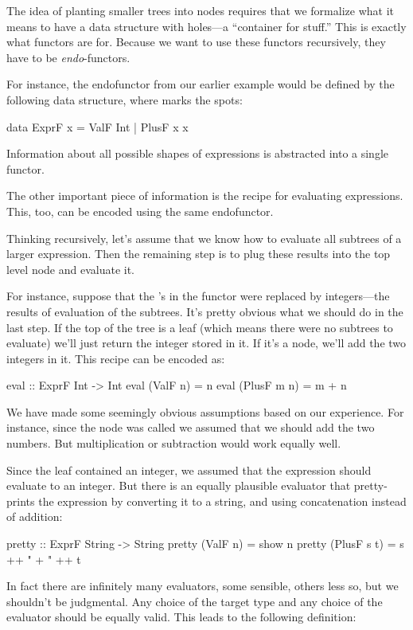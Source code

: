 \documentclass[DaoFP]{subfiles}
\begin{document}
The idea of planting smaller trees into nodes requires that we formalize what it means to have a data structure with holes---a ``container for stuff.'' This is exactly what functors are for. Because we want to use these functors recursively, they have to be \emph{endo}-functors.

For instance, the endofunctor from our earlier example would be defined by the following data structure, where  marks the spots:
\begin{haskell}
data ExprF x = ValF Int | PlusF x x
\end{haskell}
Information about all possible shapes of expressions is abstracted into a single functor. 

The other important piece of information is the recipe for evaluating expressions. This, too, can be encoded using the same endofunctor. 

Thinking recursively, let's assume that we know how to evaluate all subtrees of a larger expression. Then the remaining step is to plug these results into the top level node and evaluate it. 

For instance, suppose that the 's in the functor were replaced by integers---the results of evaluation of the subtrees. It's pretty obvious what we should do in the last step. If the top of the tree is a leaf  (which means there were no subtrees to evaluate) we'll just return the integer stored in it. If it's a  node, we'll add the two integers in it. This recipe can be encoded as:
\begin{haskell}
eval :: ExprF Int -> Int
eval (ValF n)   = n
eval (PlusF m n) = m + n
\end{haskell}

We have made some seemingly obvious assumptions based on our experience. For instance, since the node was called  we assumed that we should add the two numbers. But multiplication or subtraction would work equally well.

Since the leaf  contained an integer, we assumed that the expression should evaluate to an integer. But there is an equally plausible evaluator that pretty-prints the expression by converting it to a string, and using concatenation instead of addition:
\begin{haskell}
pretty :: ExprF String -> String
pretty (ValF n)   = show n
pretty (PlusF s t) = s ++ " + " ++ t
\end{haskell}

In fact there are infinitely many evaluators, some sensible, others less so, but we shouldn't be judgmental. Any choice of the target type and any choice of the evaluator should be equally valid. This leads to the following definition:
\end{document}
